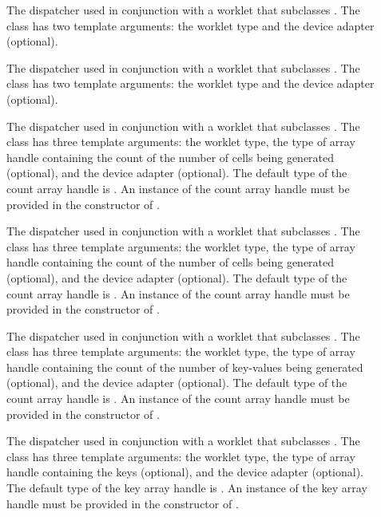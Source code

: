\begin{description}
\item[] The dispatcher used in conjunction with
  a worklet that subclasses . The class has two
  template arguments: the worklet type and the device adapter (optional).
\item[] The dispatcher used in conjunction with
  a worklet that subclasses . The class has two
  template arguments: the worklet type and the device adapter (optional).
\item[] The dispatcher used in
  conjunction with a worklet that subclasses
  . The class has three template arguments: the
  worklet type, the type of array handle containing the count of the number
  of cells being generated (optional), and the device adapter
  (optional). The default type of the count array handle is
  \textcode{<}\textcode{>}. An instance of the
  count array handle must be provided in the constructor of
  .
\item[] The dispatcher used in
  conjunction with a worklet that subclasses
  . The class has three template arguments: the
  worklet type, the type of array handle containing the count of the number
  of cells being generated (optional), and the device adapter
  (optional). The default type of the count array handle is
  \textcode{<}\textcode{>}. An instance of the
  count array handle must be provided in the constructor of
  .
\item[] The dispatcher used in
  conjunction with a worklet that subclasses
  . The class has three template arguments:
  the worklet type, the type of array handle containing the count of the
  number of key-values being generated (optional), and the device adapter
  (optional). The default type of the count array handle is
  \textcode{<}\textcode{>}. An instance of the
  count array handle must be provided in the constructor of
  .
\item[] The dispatcher used in
  conjunction with a worklet that subclasses
  . The class has three template arguments:
  the worklet type, the type of array handle containing the keys
  (optional), and the device adapter (optional). The default type of the
  key array handle is
  \textcode{<}\textcode{>}. An instance of the
  key array handle must be provided in the constructor of
  .
\end{description}

